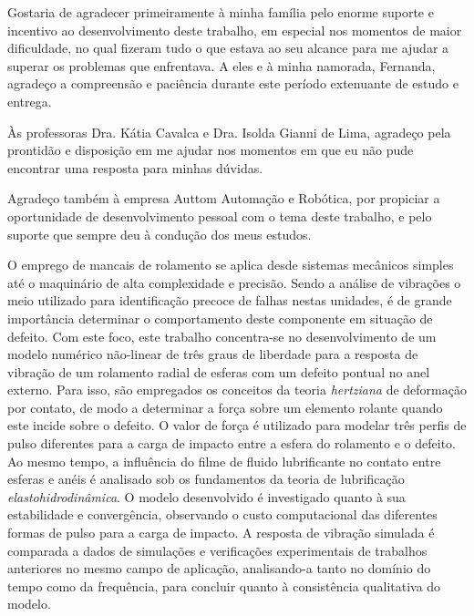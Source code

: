 \imprimircapa
\imprimirfolhaderosto
{}

\begin{agradecimentos}
	Gostaria de agradecer primeiramente à minha família pelo enorme suporte e incentivo ao desenvolvimento deste trabalho, em especial nos momentos de maior dificuldade, no qual fizeram tudo o que estava ao seu alcance para me ajudar a superar os problemas que enfrentava.
	A eles e à minha namorada, Fernanda, agradeço a compreensão e paciência durante este período extenuante de estudo e entrega.
	
	Às professoras Dra. Kátia Cavalca e Dra. Isolda Gianni de Lima, agradeço pela prontidão e disposição em me ajudar nos momentos em que eu não pude encontrar uma resposta para minhas dúvidas.
	
	Agradeço também à empresa Auttom Automação e Robótica, por propiciar a oportunidade de desenvolvimento pessoal com o tema deste trabalho, e pelo suporte que sempre deu à condução dos meus estudos.
\end{agradecimentos}

\begin{resumo}
	O emprego de mancais de rolamento se aplica desde sistemas mecânicos simples até o maquinário de alta complexidade e precisão.
	Sendo a análise de vibrações o meio utilizado para identificação precoce de falhas nestas unidades, é de grande importância determinar o comportamento deste componente em situação de defeito.
	Com este foco, este trabalho concentra-se no desenvolvimento de um modelo numérico não-linear de três graus de liberdade para a resposta de vibração de um rolamento radial de esferas com um defeito pontual no anel externo.
	Para isso, são empregados os conceitos da teoria \emph{hertziana} de deformação por contato, de modo a determinar a força sobre um elemento rolante quando este incide sobre o defeito.
	O valor de força é utilizado para modelar três perfis de pulso diferentes para a carga de impacto entre a esfera do rolamento e o defeito.
	Ao mesmo tempo, a influência do filme de fluido lubrificante no contato entre esferas e anéis é analisado sob os fundamentos da teoria de lubrificação \emph{elastohidrodinâmica}.
	O modelo desenvolvido é investigado quanto à sua estabilidade e convergência, observando o custo computacional das diferentes formas de pulso para a carga de impacto.
	A resposta de vibração simulada é comparada a dados de simulações e verificações experimentais de trabalhos anteriores no mesmo campo de aplicação, analisando-a tanto no domínio do tempo como da frequência, para concluir quanto à consistência qualitativa do modelo.
\end{resumo}

